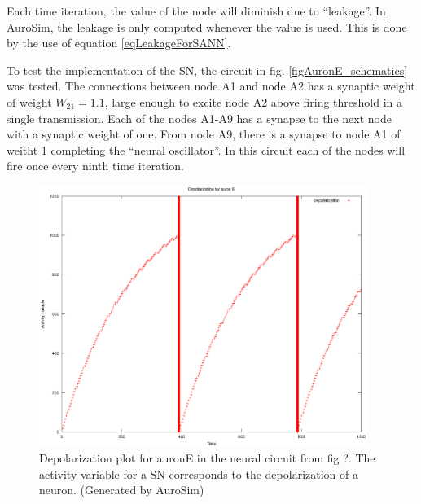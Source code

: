 	Each time iteration, the value of the node will diminish due to ``leakage''. 
	In AuroSim, the leakage is only computed whenever the value is used.
	This is done by the use of equation \eqref{eqLeakageForSANN}.

	To test the implementation of the SN, the circuit in fig. \ref{figAuronE_schematics}
		was tested. The connections between node A1 and node A2 has a synaptic weight of weight $W_{21}=1.1$, large enough to excite node A2 above firing threshold in a single transmission.
	Each of the nodes A1-A9 has a synapse to the next node with a synaptic weight of one. 
	From node A9, there is a synapse to node A1 of weitht 1 completing the ``neural oscillator''. In this circuit each of the nodes will fire once every ninth time iteration.

	\begin{figure}[hb!tp]
		\centering 				%
		\includegraphics[width=0.95\textwidth]{depolPlotAvSN/eps_auronE-depol}
		\caption{Depolarization plot for auronE in the neural circuit from fig ?. The activity variable for a SN corresponds to the depolarization of a neuron.
		(Generated by AuroSim)} %
		\label{figAuronE}
	\end{figure}

